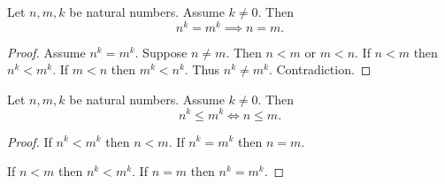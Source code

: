 \documentclass[10pt]{article}
\begin{document}
  \begin{forthel}
    \begin{corollary}[id=ARITHMETIC_09_2797602550579200,printid]
      Let $n, m, k$ be natural numbers.
      Assume $k \neq 0$.
      Then \[ n^{k} = m^{k} \implies n = m. \]
    \end{corollary}
    \begin{proof}
      Assume $n^{k} = m^{k}$.
      Suppose $n \neq m$.
      Then $n < m$ or $m < n$.
      If $n < m$ then $n^{k} < m^{k}$.
      If $m < n$ then $m^{k} < n^{k}$.
      Thus $n^{k} \neq m^{k}$.
      Contradiction.
    \end{proof}
  \end{forthel}

  \begin{forthel}
    \begin{corollary}[id=ARITHMETIC_09_6875081963732992,printid]
      Let $n, m, k$ be natural numbers.
      Assume $k \neq 0$.
      Then \[ n^{k} \leq m^{k} \iff n \leq m. \]
    \end{corollary}
    \begin{proof}
      If $n^{k} < m^{k}$ then $n < m$.
      If $n^{k} = m^{k}$ then $n = m$.

      If $n < m$ then $n^{k} < m^{k}$.
      If $n = m$ then $n^{k} = m^{k}$.
    \end{proof}
  \end{forthel}
\end{document}
